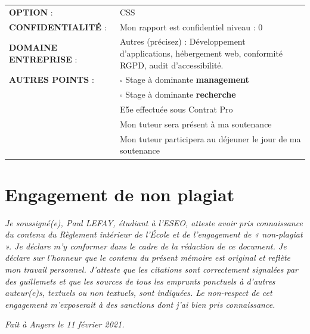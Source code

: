 \documentclass[12pt]{article}
\begin{document}
\begin{center}
	\begin{tabular}{ m{5cm} m{11.5cm} }
	\textbf{OPTION} : &  \mbox{\ooalign{$\checkmark$\cr\hidewidth$\square$\hidewidth\cr}} CSS  \\
    \textbf{CONFIDENTIALITÉ} :  & Mon rapport est confidentiel niveau : \mbox{\ooalign{$\checkmark$\cr\hidewidth$\square$\hidewidth\cr}} 0 \\
    \textbf{DOMAINE ENTREPRISE} : & \mbox{\ooalign{$\checkmark$\cr\hidewidth$\square$\hidewidth\cr}} Autres (précisez) : Développement d'applications, hébergement web, conformité RGPD, audit d'accessibilité. \\
    \textbf{AUTRES POINTS} : &  $\square$ Stage à dominante \textbf{management} \\
                             &  $\square$ Stage à dominante \textbf{recherche} \\
                             & \mbox{\ooalign{$\checkmark$\cr\hidewidth$\square$\hidewidth\cr}} E5e effectuée sous Contrat Pro \\
                             &  \mbox{\ooalign{$\checkmark$\cr\hidewidth$\square$\hidewidth\cr}} Mon tuteur sera présent à ma soutenance \\
                             &  \mbox{\ooalign{$\checkmark$\cr\hidewidth$\square$\hidewidth\cr}} Mon tuteur participera au déjeuner le jour de ma soutenance \\
\end{tabular}
\end{center}

\newpage
\section*{Engagement de non plagiat}
\textit{Je soussigné(e), Paul LEFAY, étudiant à l'\gls{ESEO}, atteste avoir pris connaissance du contenu du Règlement intérieur de l'École et de l'engagement de « non-plagiat ». 
Je déclare m'y conformer dans le cadre de la rédaction de ce document. 
Je déclare sur l'honneur que le contenu du présent mémoire est original et reflète mon travail personnel. 
J'atteste que les citations sont correctement signalées par des guillemets et que les sources de tous les emprunts ponctuels à d'autres auteur(e)s, textuels ou non textuels, sont indiquées. 
Le non-respect de cet engagement m'exposerait à des sanctions dont j'ai bien pris connaissance.}

\textit{Fait à Angers le 11 février 2021.}
\end{document}
